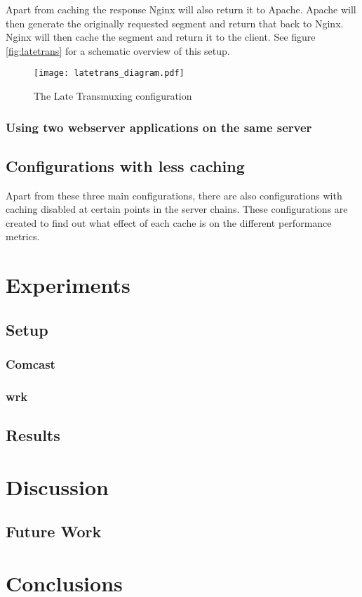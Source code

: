 \documentclass[twoside,openright]{uva-bachelor-thesis}
\begin{document}
Apart from caching the response Nginx will also return it to Apache. Apache will
then generate the originally requested segment and return that back to Nginx.
Nginx will then cache the segment and return it to the client. See figure
\vref{fig:latetrans} for a schematic overview of this setup.

\begin{figure}
    \texttt{[image: latetrans\_diagram.pdf]}
    \caption{The Late Transmuxing configuration}\label{fig:latetrans}
\end{figure}

\subsection{Using two webserver applications on the same server}


\section{Configurations with less caching}
Apart from these three main configurations, there are also configurations
with caching disabled at certain points in the server chains. These
configurations are created to find out what effect of each cache is on the
different performance metrics.






\chapter{Experiments}
\section{Setup}
\subsection{Comcast}
\subsection{wrk}
\section{Results}

\chapter{Discussion}
\section{Future Work}
\chapter{Conclusions}


\printbibliography[heading=bibintoc]{}

\printglossaries{}
\end{document}
